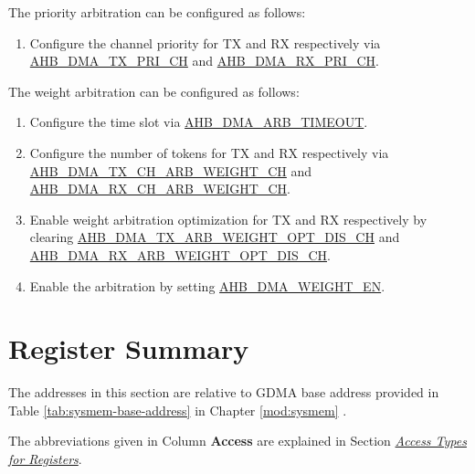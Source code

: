 \documentclass[main\_\_EN.tex]{subfiles}
\begin{document}
The priority arbitration can be configured as follows:
\begin{enumerate}
    \item Configure the channel priority for TX and RX respectively via \hyperref[fielddesc:AHBDMATXPRICHN]{AHB\_DMA\_TX\_PRI\_CH} and \hyperref[fielddesc:AHBDMARXPRICHN]{AHB\_DMA\_RX\_PRI\_CH}.
\end{enumerate}

The weight arbitration can be configured as follows:
\begin{enumerate}
    \item Configure the time slot via \hyperref[fielddesc:AHBDMAARBTIMEOUT]{AHB\_DMA\_ARB\_TIMEOUT}.
    \item Configure the number of tokens for TX and RX respectively via \hyperref[fielddesc:AHBDMATXCHARBWEIGHTCHN]{AHB\_DMA\_TX\_CH\_ARB\_WEIGHT\_CH} and \hyperref[fielddesc:AHBDMARXCHARBWEIGHTCHN]{AHB\_DMA\_RX\_CH\_ARB\_WEIGHT\_CH}.
    \item Enable weight arbitration optimization for TX and RX respectively by clearing \hyperref[fielddesc:AHBDMATXARBWEIGHTOPTDISCHN]{AHB\_DMA\_TX\_ARB\_WEIGHT\_OPT\_DIS\_CH} and \hyperref[fielddesc:AHBDMARXARBWEIGHTOPTDISCHN]{AHB\_DMA\_RX\_ARB\_WEIGHT\_OPT\_DIS\_CH}.
    \item Enable the arbitration by setting \hyperref[fielddesc:AHBDMAWEIGHTEN]{AHB\_DMA\_WEIGHT\_EN}.
\end{enumerate}





\newpage
\begin{landscape}
\hypertarget{dma-reg-summ}{}
\section{Register Summary}
\label{sec:dma-reg-summ}


The addresses in this section are relative to GDMA base address provided in Table \ref{tab:sysmem-base-address} in Chapter \ref{mod:sysmem} \textit{}.

The abbreviations given in Column \textbf{Access} are explained in Section \hyperref[glossary-access-types]{\textit{Access Types for Registers}}.



\end{landscape}
\end{document}

